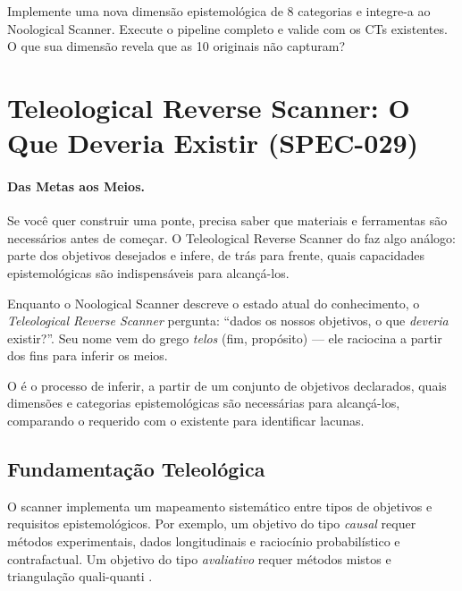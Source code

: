 \begin{exercicio}
Implemente uma nova dimensão epistemológica de 8 categorias e integre-a
ao Noological Scanner. Execute o pipeline completo e valide com os CTs
existentes. O que sua dimensão revela que as 10 originais não capturam?
\end{exercicio}

\section{Teleological Reverse Scanner: O Que Deveria Existir (SPEC-029)}
\label{sec:teleological-scanner}
\nivelavancado

\paragraph{Das Metas aos Meios.} Se você quer construir uma ponte, precisa saber que materiais e ferramentas são necessários antes de começar. O Teleological Reverse Scanner do \opencodeeco{} faz algo análogo: parte dos objetivos desejados e infere, de trás para frente, quais capacidades epistemológicas são indispensáveis para alcançá-los.

Enquanto o Noological Scanner descreve o estado atual do conhecimento, o
\emph{Teleological Reverse Scanner} pergunta: ``dados os nossos objetivos,
o que \emph{deveria} existir?''. Seu nome vem do grego \emph{telos} (fim,
propósito) --- ele raciocina a partir dos fins para inferir os meios.

\begin{definicao}
O  é o processo de inferir, a
partir de um conjunto de objetivos declarados, quais dimensões e categorias
epistemológicas são necessárias para alcançá-los, comparando o requerido
com o existente para identificar lacunas.
\end{definicao}

\subsection{Fundamentação Teleológica}

O scanner implementa um mapeamento sistemático entre tipos de objetivos e
requisitos epistemológicos. Por exemplo, um objetivo do tipo \emph{causal}
requer métodos experimentais, dados longitudinais e raciocínio probabilístico
e contrafactual. Um objetivo do tipo \emph{avaliativo} requer métodos mistos
e triangulação quali-quanti \cite{popper2005logica, feuerstein2002estatistica}.

